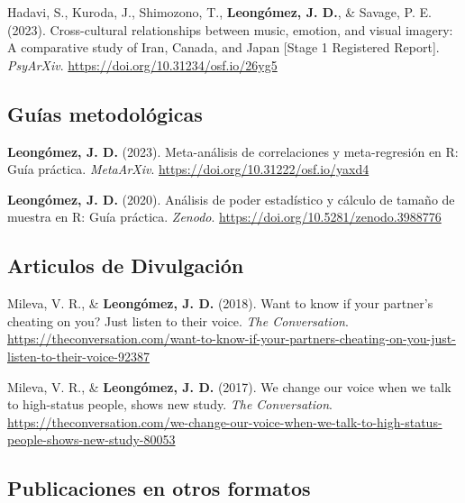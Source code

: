 \documentclass[11pt,a4paper,]{awesome-cv}
\begin{document}
Hadavi, S., Kuroda, J., Shimozono, T., \textbf{Leongómez, J. D.}, \&
Savage, P. E. (2023). Cross-cultural relationships between music,
emotion, and visual imagery: A comparative study of Iran, Canada, and
Japan {[}Stage 1 Registered Report{]}. \emph{PsyArXiv}.
\url{https://doi.org/10.31234/osf.io/26yg5}

\endgroup

\hypertarget{guuxedas-metodoluxf3gicas}{%
\subsection{Guías metodológicas}\label{guuxedas-metodoluxf3gicas}}

\begingroup
\footnotesize
\setlength{\parindent}{-0.5in}
\setlength{\leftskip}{0.5in}

\textbf{Leongómez, J. D.} (2023). Meta-análisis de correlaciones y
meta-regresión en R: Guía práctica. \emph{MetaArXiv}.
\url{https://doi.org/10.31222/osf.io/yaxd4}

\textbf{Leongómez, J. D.} (2020). Análisis de poder estadístico y
cálculo de tamaño de muestra en R: Guía práctica. \emph{Zenodo}.
\url{https://doi.org/10.5281/zenodo.3988776}

\endgroup

\hypertarget{articulos-de-divulgaciuxf3n}{%
\subsection{Articulos de
Divulgación}\label{articulos-de-divulgaciuxf3n}}

\begingroup
\footnotesize
\setlength{\parindent}{-0.5in}
\setlength{\leftskip}{0.5in}

Mileva, V. R., \& \textbf{Leongómez, J. D.} (2018). Want to know if your
partner's cheating on you? Just listen to their voice. \emph{The
Conversation}.
\url{https://theconversation.com/want-to-know-if-your-partners-cheating-on-you-just-listen-to-their-voice-92387}

Mileva, V. R., \& \textbf{Leongómez, J. D.} (2017). We change our voice
when we talk to high-status people, shows new study. \emph{The
Conversation}.
\url{https://theconversation.com/we-change-our-voice-when-we-talk-to-high-status-people-shows-new-study-80053}

\endgroup

\hypertarget{publicaciones-en-otros-formatos}{%
\subsection{Publicaciones en otros
formatos}\label{publicaciones-en-otros-formatos}}
\end{document}
